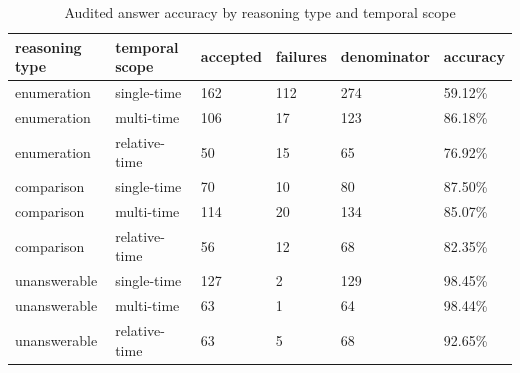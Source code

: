 \begin{table}[htbp]
\centering
\setlength{\tabcolsep}{5pt}
\caption{Audited answer accuracy by reasoning type and temporal scope}
\label{tab:d5c-reasoning-by-temporal-scope}
\begin{tabular}{llllll}
\toprule
reasoning type & temporal scope & accepted & failures & denominator & accuracy \\
\midrule
enumeration & single-time & 162 & 112 & 274 & 59.12\% \\
enumeration & multi-time & 106 & 17 & 123 & 86.18\% \\
enumeration & relative-time & 50 & 15 & 65 & 76.92\% \\
comparison & single-time & 70 & 10 & 80 & 87.50\% \\
comparison & multi-time & 114 & 20 & 134 & 85.07\% \\
comparison & relative-time & 56 & 12 & 68 & 82.35\% \\
unanswerable & single-time & 127 & 2 & 129 & 98.45\% \\
unanswerable & multi-time & 63 & 1 & 64 & 98.44\% \\
unanswerable & relative-time & 63 & 5 & 68 & 92.65\% \\
\bottomrule
\end{tabular}
\end{table}
